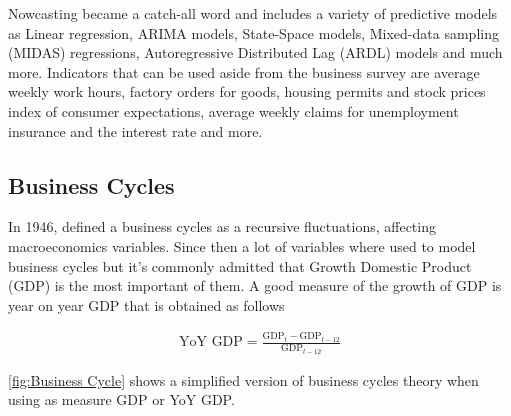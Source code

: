 \documentclass[12pt,a4paper,oneside]{book}
\begin{document}
Nowcasting became a catch-all word and includes a variety of predictive models as Linear regression, ARIMA models, State-Space models, Mixed-data sampling (MIDAS) regressions, Autoregressive Distributed Lag (ARDL) models and much more.
Indicators that can be used aside from the business survey are average weekly work hours, factory orders for goods, housing permits and stock prices index of consumer expectations, average weekly claims for unemployment insurance and the interest rate and more.


\subsection{Business Cycles}
\label{sec:Business Cycles}

In 1946, \citeauthor{mitchell_measuring_1946} defined a business cycles as a recursive fluctuations, affecting macroeconomics variables. Since then a lot of variables where used to model business cycles but it's commonly admitted that Growth Domestic Product (GDP) is the most important of them. 
A good measure of the growth of GDP is year on year GDP that is obtained as follows

\begin{eqnarray}
	\mbox{YoY GDP} = \frac{\mbox{GDP}_t - \mbox{GDP}_{t-12}}{\mbox{GDP}_{t-12}}      \label{eq:YoY GDP}
\end{eqnarray}

\autoref{fig:Business Cycle} shows a simplified version of business cycles theory when using as measure GDP or YoY GDP.
\end{document}
